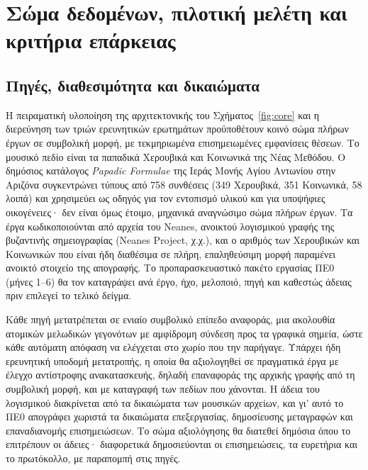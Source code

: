 \documentclass[a4paper]{article}
\begin{document}
\section{Σώμα δεδομένων, πιλοτική μελέτη και κριτήρια επάρκειας}\label{sec:data}
\subsection{Πηγές, διαθεσιμότητα και δικαιώματα}\label{sec:corpus}
Η πειραματική υλοποίηση της αρχιτεκτονικής του Σχήματος~\ref{fig:core} και η διερεύνηση των τριών ερευνητικών ερωτημάτων προϋποθέτουν κοινό σώμα πλήρων έργων σε συμβολική μορφή, με τεκμηριωμένα επισημειωμένες εμφανίσεις θέσεων. Το μουσικό πεδίο είναι τα παπαδικά Χερουβικά και Κοινωνικά της Νέας Μεθόδου. Ο δημόσιος κατάλογος \emph{Papadic Formulae} της Ιεράς Μονής Αγίου Αντωνίου στην Αριζόνα συγκεντρώνει τύπους από 758 συνθέσεις (349 Χερουβικά, 351 Κοινωνικά, 58 λοιπά) και χρησιμεύει ως οδηγός για τον εντοπισμό υλικού και για υποψήφιες οικογένειες· δεν είναι όμως έτοιμο, μηχανικά αναγνώσιμο σώμα πλήρων έργων. Τα έργα κωδικοποιούνται από αρχεία του Neanes, ανοικτού λογισμικού γραφής της βυζαντινής σημειογραφίας (Neanes Project, χ.χ.), και ο αριθμός των Χερουβικών και Κοινωνικών που είναι ήδη διαθέσιμα σε πλήρη, επαληθεύσιμη μορφή παραμένει ανοικτό στοιχείο της απογραφής. Το προπαρασκευαστικό πακέτο εργασίας ΠΕ0 (μήνες 1--6) θα τον καταγράψει ανά έργο, ήχο, μελοποιό, πηγή και καθεστώς άδειας πριν επιλεγεί το τελικό δείγμα.

Κάθε πηγή μετατρέπεται σε ενιαίο συμβολικό επίπεδο αναφοράς, μια ακολουθία ατομικών μελωδικών γεγονότων με αμφίδρομη σύνδεση προς τα γραφικά σημεία, ώστε κάθε αυτόματη απόφαση να ελέγχεται στο χωρίο που την παρήγαγε. Υπάρχει ήδη ερευνητική υποδομή μετατροπής, η οποία θα αξιολογηθεί σε πραγματικά έργα με έλεγχο αντίστροφης ανακατασκευής, δηλαδή επαναφοράς της αρχικής γραφής από τη συμβολική μορφή, και με καταγραφή των πεδίων που χάνονται. Η άδεια του λογισμικού διακρίνεται από τα δικαιώματα των μουσικών αρχείων, και γι' αυτό το ΠΕ0 απογράφει χωριστά τα δικαιώματα επεξεργασίας, δημοσίευσης μεταγραφών και επαναδιανομής επισημειώσεων. Το σώμα αξιολόγησης θα διατεθεί δημόσια όπου το επιτρέπουν οι άδειες· διαφορετικά δημοσιεύονται οι επισημειώσεις, τα ευρετήρια και το πρωτόκολλο, με παραπομπή στις πηγές.
\end{document}
